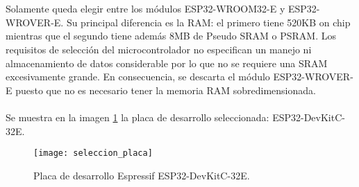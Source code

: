\\
\\
Solamente queda elegir entre los módulos ESP32-WROOM32-E y ESP32-WROVER-E. Su principal diferencia es la RAM: el primero tiene 520KB on chip mientras que el segundo tiene además 8MB de Pseudo SRAM o PSRAM. Los requisitos de selección del microcontrolador no especifican un manejo ni almacenamiento de datos considerable por lo que no se requiere una SRAM excesivamente grande. En consecuencia, se descarta el módulo ESP32-WROVER-E puesto que no es necesario tener la memoria RAM sobredimensionada.
\\
\\
Se muestra en la imagen \ref{fig:seleccion_placa} la placa de desarrollo seleccionada: ESP32-DevKitC-32E.

\begin{figure}[!htb]
\centering
\texttt{[image: seleccion\_placa]}
  \caption{Placa de desarrollo Espressif ESP32-DevKitC-32E.}\label{fig:seleccion_placa}
\end{figure}

